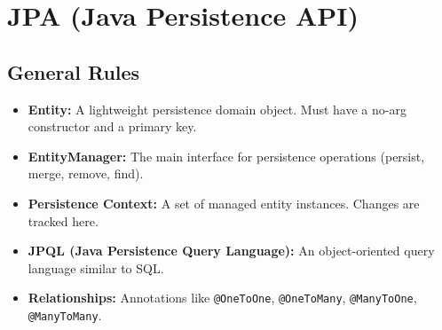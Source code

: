
\section*{JPA (Java Persistence API)}

\subsection*{General Rules}
\begin{itemize}
    \item \textbf{Entity:} A lightweight persistence domain object. Must have a no-arg constructor and a primary key.
    \item \textbf{EntityManager:} The main interface for persistence operations (persist, merge, remove, find).
    \item \textbf{Persistence Context:} A set of managed entity instances. Changes are tracked here.
    \item \textbf{JPQL (Java Persistence Query Language):} An object-oriented query language similar to SQL.
    \item \textbf{Relationships:} Annotations like \texttt{@OneToOne}, \texttt{@OneToMany}, \texttt{@ManyToOne}, \texttt{@ManyToMany}.
\end{itemize}
